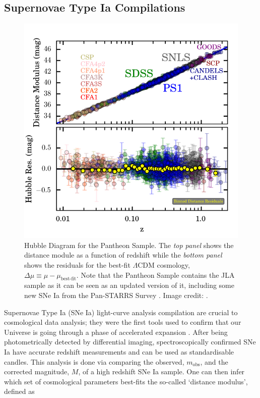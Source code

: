 \subsection{Supernovae Type Ia Compilations}
\begin{figure}
\begin{center}
\includegraphics[width=\textwidth]{Intro-FIGS/hubble.pdf}
\caption[Hubble Diagram for the Pantheon Sample. Image credit: \cite{2018Pantheon}.]{Hubble Diagram for the Pantheon Sample. The \textit{top panel} shows the distance module as a function of redshift while the \textit{bottom panel} shows the residuals for the best-fit $\Lambda$CDM cosmology, $\Delta \mu \equiv \mu - \mu_{\text{best-fit}}$. Note that the Pantheon Sample contains the JLA sample as it can be seen as an updated version of it, including some new SNe Ia from the Pan-STARRS Survey \citep{2016-PanStarrs}. Image credit: \cite{2018Pantheon}.}
\label{fig:Pantheon}
\end{center}
\end{figure}
Supernovae Type Ia (SNe Ia) light-curve analysis compilation are crucial to cosmological data analysis; they were the first tools used to confirm that our Universe is going through a phase of accelerated expansion \citep{1998Riess,1999Perlmutter}. After being photometrically detected by differential imaging, spectroscopically confirmed SNe Ia have accurate redshift measurements and can be used as standardisable candles. This analysis is done via comparing the observed, $m_{\text{obs}}$, and the corrected magnitude, $M$, of a high redshift SNe Ia sample. One can then infer which set of cosmological parameters best-fits the so-called `distance modulus', defined as \citep{2007Salt-2,JLAdata}
